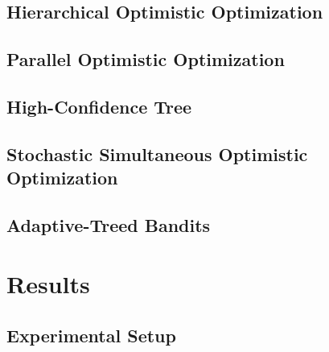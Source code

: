 \documentclass[a4paper,10pt]{article}
\begin{document}
\subsection{Hierarchical Optimistic Optimization}

\subsection{Parallel Optimistic Optimization}

\subsection{High-Confidence Tree}

\subsection{Stochastic Simultaneous Optimistic Optimization}

\subsection{Adaptive-Treed Bandits}

\section{Results}
\subsection{Experimental Setup}
\end{document}
